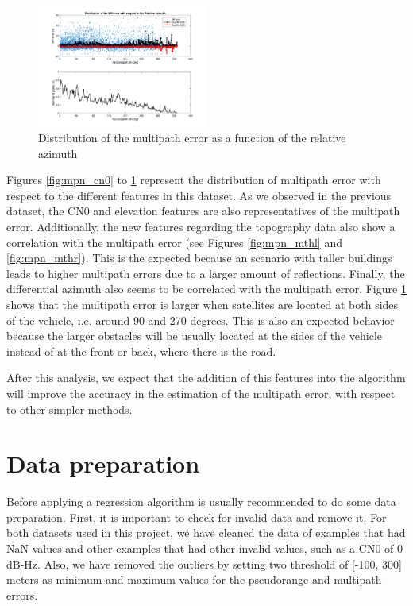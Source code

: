 \documentclass[a4paper, report, oneside, UKenglish]{memoir}
\begin{document}
\begin{figure}[ht]
    \centering
    \includegraphics[width=0.5\textwidth]{data-analysis/mpn_daz.png}
    \caption{Distribution of the multipath error as a function of the relative azimuth}
    \label{fig:mpn_daz}
\end{figure}

Figures \ref{fig:mpn_cn0} to \ref{fig:mpn_daz} represent the distribution of multipath error with respect to the different features in this dataset. As we observed in the previous dataset, the CN0 and elevation features are also representatives of the multipath error. Additionally, the new features regarding the topography data also show a correlation with the multipath error (see Figures  \ref{fig:mpn_mthl} and \ref{fig:mpn_mthr}). This is the expected because an scenario with taller buildings leads to higher multipath errors due to a larger amount of reflections. Finally, the differential azimuth also seems to be correlated with the multipath error. Figure \ref{fig:mpn_daz} shows that the multipath error is larger when satellites are located at both sides of the vehicle, i.e. around 90 and 270 degrees. This is also an expected behavior because the larger obstacles will be usually located at the sides of the vehicle instead of at the front or back, where there is the road.

After this analysis, we expect that the addition of this features into the algorithm will improve the accuracy in the estimation of the multipath error, with respect to other simpler methods.



\section{Data preparation}\label{DataPrep}
Before applying a regression algorithm is usually recommended to do some data preparation. First, it is important to check for invalid data and remove it. For both datasets used in this project, we have cleaned the data of examples that had NaN values and other examples that had other invalid values, such as a CN0 of 0 dB-Hz. Also, we have removed the outliers by setting two threshold of [-100, 300] meters as minimum and maximum values for the pseudorange and multipath errors.
\end{document}
